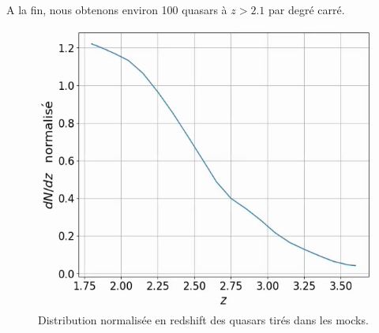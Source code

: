 \documentclass[11pt, twoside, a4paper, openright]{report}
\begin{document}
A la fin, nous obtenons environ \num{100} quasars à $z > \num{2.1}$ par degré carré.
\begin{figure}
  \centering
  \includegraphics[scale=0.5]{dndz_qso}
  \caption{Distribution normalisée en redshift des quasars tirés dans les mocks.}
  \label{fig:dndz_qso}
\end{figure}
\end{document}
